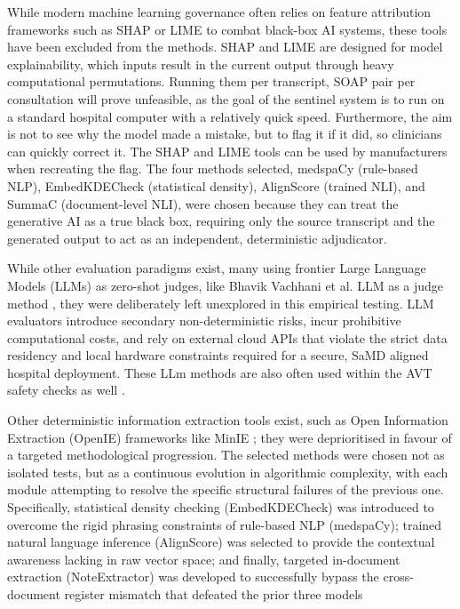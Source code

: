 \documentclass[11pt,a4paper]{article}
\begin{document}
While modern machine learning governance often relies on feature attribution frameworks such as SHAP \cite{Lundberg2017} or LIME \cite{Ribeiro2016} to combat black-box AI systems, these tools have been excluded from the methods. SHAP and LIME are designed for model explainability, which inputs result in the current output through heavy computational permutations. Running them per transcript, SOAP pair per consultation will prove unfeasible, as the goal of the sentinel system is to run on a standard hospital computer with a relatively quick speed. Furthermore, the aim is not to see why the model made a mistake, but to flag it if it did, so clinicians can quickly correct it. The SHAP and LIME tools can be used by manufacturers when recreating the flag. The four methods selected, medspaCy (rule-based NLP), EmbedKDECheck (statistical density), AlignScore (trained NLI), and SummaC (document-level NLI), were chosen because they can treat the generative AI as a true black box, requiring only the source transcript and the generated output to act as an independent, deterministic adjudicator. 

While other evaluation paradigms exist, many using frontier Large Language Models (LLMs) as zero-shot judges, like Bhavik Vachhani et al. LLM as a judge method \cite{vachhani2026beyond}, they were deliberately left unexplored in this empirical testing. LLM evaluators introduce secondary non-deterministic risks, incur prohibitive computational costs, and rely on external cloud APIs that violate the strict data residency and local hardware constraints required for a secure, SaMD aligned hospital deployment. These LLm methods are also often used within the AVT safety checks as well \cite{tortus2026}.

Other deterministic information extraction tools exist, such as Open Information Extraction (OpenIE) frameworks like MinIE \cite{Gashteovski2017}; they were deprioritised in favour of a targeted methodological progression. The selected methods were chosen not as isolated tests, but as a continuous evolution in algorithmic complexity, with each module attempting to resolve the specific structural failures of the previous one. Specifically, statistical density checking (EmbedKDECheck) was introduced to overcome the rigid phrasing constraints of rule-based NLP (medspaCy); trained natural language inference (AlignScore) was selected to provide the contextual awareness lacking in raw vector space; and finally, targeted in-document extraction (NoteExtractor) was developed to successfully bypass the cross-document register mismatch that defeated the prior three models
\end{document}

